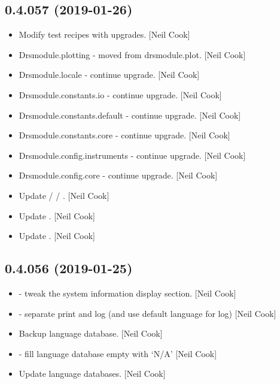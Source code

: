 \documentclass[a4paper,10pt,english]{report}
\begin{document}
\subsection{0.4.057 (2019-01-26)}
\label{\detokenize{misc/changelog:id207}}\begin{itemize}
\item {} 
Modify test recipes with upgrades. {[}Neil Cook{]}

\item {} 
Drsmodule.plotting - moved from drsmodule.plot. {[}Neil Cook{]}

\item {} 
Drsmodule.locale - continue upgrade. {[}Neil Cook{]}

\item {} 
Drsmodule.constants.io - continue upgrade. {[}Neil Cook{]}

\item {} 
Drsmodule.constants.default - continue upgrade. {[}Neil Cook{]}

\item {} 
Drsmodule.constants.core - continue upgrade. {[}Neil Cook{]}

\item {} 
Drsmodule.config.instruments - continue upgrade. {[}Neil Cook{]}

\item {} 
Drsmodule.config.core - continue upgrade. {[}Neil Cook{]}

\item {} 
Update  /  / . {[}Neil Cook{]}

\item {} 
Update . {[}Neil Cook{]}

\item {} 
Update . {[}Neil Cook{]}

\end{itemize}


\subsection{0.4.056 (2019-01-25)}
\label{\detokenize{misc/changelog:id208}}\begin{itemize}
\item {} 
 - tweak the system information display section. {[}Neil
Cook{]}

\item {} 
 - separate print and log (and use default language for log)
{[}Neil Cook{]}

\item {} 
Backup language database. {[}Neil Cook{]}

\item {} 
 - fill language database empty with ‘N/A’ {[}Neil Cook{]}

\item {} 
Update language databases. {[}Neil Cook{]}

\end{itemize}
\end{document}
